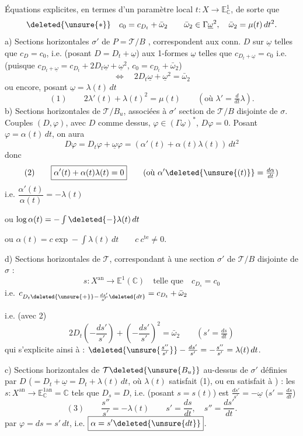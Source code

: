Équations explicites, en termes d'un paramètre local $t:X\longrightarrow\mathbb E^1_{\mathbb C}$, de sorte que
\[
\deleted{\unsure{*}}\quad c_0=c_{D_t}+\bar\omega_2\qquad \bar\omega_2\in\Gamma\underline\omega^2,\quad\bar\omega_2=\mu(t)\,dt^2.
\]
a) Sections horizontales $\sigma'$ de $P=\mathcal T/B$ , correspondent aux conn. $D$ sur $\underline\omega$ telles que $c_D=c_0$, i.e. (posant $D=D_t+\underline\omega$) aux 1-formes $\underline\omega$ telles que $c_{D_t+\underline\omega}=c_0$ i.e. (puisque $c_{D_t+\underline\omega}=c_{D_t}+2D_t\underline\omega+\underline\omega^2$, $c_0=c_{D_t}+\bar\omega_2$)
\[
\Longleftrightarrow\quad 2D_t\underline\omega+\underline\omega^2=\bar\omega_2
\]
ou encore, posant $\underline\omega=\lambda(t)\,dt$
\[
(1)\qquad\boxed{2\lambda'(t)+\lambda(t)^2=\mu(t)}\qquad(\text{où }\lambda'=\tfrac d{dt}\lambda).
\]
b) Sections horizontales de $\mathcal T/B_u$, associées à $\sigma'$ section de $\mathcal T/B$ disjointe de $\sigma$. Couples $(D,\varphi)$, avec $D$ comme dessus, $\varphi\in(\Gamma\underline\omega)^*$, $D\varphi=0$. Posant $\varphi=\alpha(t)\,dt$, on aura
\[
D\varphi=D_t\varphi+\underline\omega\varphi=(\alpha'(t)+\alpha(t)\lambda(t))\,dt^2
\]
donc
\[
(2)\qquad\boxed{\alpha'(t)+\alpha(t)\lambda(t)=0}\qquad(\text{où }\alpha'\deleted{\unsure{(t)}}=\tfrac{d\alpha}{dt})
\]
i.e. $\dfrac{\alpha'(t)}{\alpha(t)}=-\lambda(t)$

ou $\log\alpha(t)=-\int\deleted{-}\lambda(t)\,dt$

ou $\alpha(t)=c\exp-\int\lambda(t)\,dt\qquad c\ c^{\mathrm{te}}\ne0$.

d) Sections horizontales de $\mathcal T$,  correspondant à une section $\sigma'$ de $\mathcal T/B$ disjointe de $\sigma$ :
\[
s:X^{\mathrm{an}}\longrightarrow\mathbb E^1(\mathbb C)\quad\text{telle que}\quad c_{D_s}=c_0
\]
i.e. $c_{D_t\deleted{\unsure{+}}-\frac{ds'}{s'}\deleted{dt}}=c_{D_t}+\bar\omega_2$

i.e. (avec 2)
\[
2D_t\left(-\frac{ds'}{s'}\right)+\left(-\frac{ds'}{s'}\right)^2=\bar\omega_2\qquad(s'=\tfrac{ds}{dt})
\]
qui s'explicite ainsi à  : $\deleted{\unsure{\frac{s''}{s'}}}-\frac{ds'}{s'}=-\frac{s''}{s'}=\lambda(t)\,dt$.

c) Sections horizontales de $\mathcal T\deleted{\unsure{B_u}}$ au-dessus de $\sigma'$ définies par $D$ ($=D_t+\underline\omega=D_t+\lambda(t)\,dt$, où $\lambda(t)$ satisfait (1), ou en satisfait à ) : les $s:X^{\mathrm{an}}\longrightarrow\mathbb E^{1\mathrm{an}}_{\mathbb C}=\mathbb C$ tels que $D_s=D$, i.e. (posant $s=s(t)$) est $\frac{ds'}{s'}=-\underline\omega$ ($s'=\frac{ds}{dt}$)
\[
(3)\qquad\frac{s''}{s'}=-\lambda(t)\qquad s'=\frac{ds}{dt},\quad s''=\frac{ds'}{dt}.
\]
 par $\varphi=ds=s'\,dt$, i.e. $\boxed{\alpha=s'\deleted{\unsure{dt}}}$.

